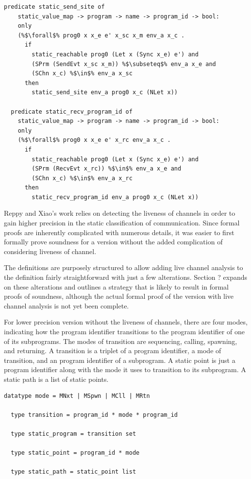 \documentclass{article}
\begin{document}
\begin{lstlisting}[language=logic, escapechar=\%]
  predicate static_send_site of
    static_value_map -> program -> name -> program_id -> bool:
    only
    (%$\forall$% prog0 x x_e e' x_sc x_m env_a x_c .
      if
        static_reachable prog0 (Let x (Sync x_e) e') and
        (SPrm (SendEvt x_sc x_m)) %$\subseteq$% env_a x_e and 
        (SChn x_c) %$\in$% env_a x_sc
      then
        static_send_site env_a prog0 x_c (NLet x))

  predicate static_recv_program_id of
    static_value_map -> program -> name -> program_id -> bool:
    only
    (%$\forall$% prog0 x x_e e' x_rc env_a x_c .
      if
        static_reachable prog0 (Let x (Sync x_e) e') and
        (SPrm (RecvEvt x_rc)) %$\in$% env_a x_e and 
        (SChn x_c) %$\in$% env_a x_rc 
      then
        static_recv_program_id env_a prog0 x_c (NLet x))
  \end{lstlisting}

Reppy and Xiao's work relies on detecting the liveness of channels in order to gain higher
precision in the static classification of communication. Since formal proofs are inherently
complicated with numerous details, it was easier to first formally prove soundness for a
version without the added complication of considering liveness of channel.

The definitions are purposely structured to allow adding live channel analysis to the
definition fairly straightforward with just a few alterations.  Section ? expands on
these alterations and outlines a strategy that is likely to result in formal proofs of
soundness, although the actual formal proof of the version with live channel analysis is
not yet been complete.  

For lower precision version without the liveness of channels, there are four modes,
indicating how the program identifier transitions to the program identifier of one of
its subprograms.
The modes of transition are sequencing, calling, spawning, and returning. A transition is a
triplet of a program identifier, a mode of transition, and an program identifier of a
subprogram. A static point is just a program identifier along with the mode it uses to
transition to its subprogram. A static path is a list of static points.  

\begin{lstlisting}[language=logic, escapechar=\%]
  datatype mode = MNxt | MSpwn | MCll | MRtn

  type transition = program_id * mode * program_id

  type static_program = transition set

  type static_point = program_id * mode

  type static_path = static_point list
  \end{lstlisting}
\end{document}

